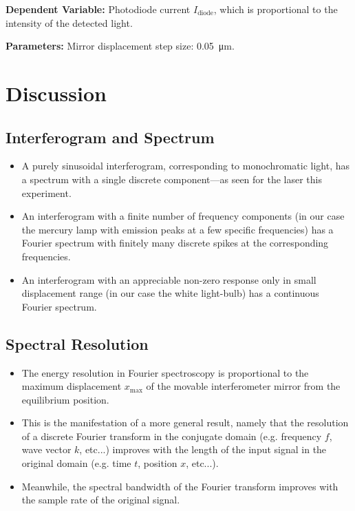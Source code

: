 \documentclass[11pt, a4paper]{article}
\begin{document}
\vspace{2mm}
\textbf{Dependent Variable:} Photodiode current $ I_{\text{diode}} $, which is proportional to the intensity of the detected light.

\vspace{2mm}
\textbf{Parameters:} Mirror displacement step size: \SI{0.05}{\micro \meter}. 

\section{Discussion}

\subsection{Interferogram and Spectrum}
\begin{itemize}
	\item A purely sinusoidal interferogram, corresponding to monochromatic light, has a spectrum with a single discrete component---as seen for the laser this experiment.
	
	\item An interferogram with a finite number of frequency components (in our case the mercury lamp with emission peaks at a few specific frequencies) has a Fourier spectrum with finitely many discrete spikes at the corresponding frequencies. 
	
	\item An interferogram with an appreciable non-zero response only in small displacement range (in our case the white light-bulb) has a continuous Fourier spectrum.
\end{itemize}


\subsection{Spectral Resolution}
\begin{itemize}
	\item The energy resolution in Fourier spectroscopy is proportional to the maximum displacement $ x_{\text{max}} $ of the movable interferometer mirror from the equilibrium position. 
	
	
	\item This is the manifestation of a more general result, namely that the resolution of a discrete Fourier transform in the conjugate domain (e.g. frequency $ f $, wave vector $ k $, etc...) improves with the length of the input signal in the original domain (e.g. time $ t $, position $ x $, etc...). 
	
	\item Meanwhile, the spectral bandwidth of the Fourier transform improves with the sample rate of the original signal.
	
\end{itemize}
\end{document}

